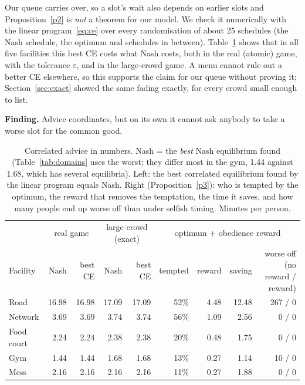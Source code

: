 \documentclass{article}
\newcommand{\finding}[1]{\par\smallskip\noindent\colorbox{cCE!7}{\parbox{\dimexpr\linewidth-2\fboxsep}{\small\textbf{Finding.} #1}}\par\smallskip}
\begin{document}
\smallskip
Our queue carries over, so a slot's wait also depends on earlier slots and Proposition~\ref{p2} is \emph{not} a
theorem for our model. We check it numerically with the linear program~\eqref{eq:ce} over every randomisation of about
25 schedules (the Nash schedule, the optimum and schedules in between). Table~\ref{tab:ce} shows that in all five
facilities this best CE costs what Nash costs, both in the real (atomic) game, with the tolerance $\varepsilon$, and in
the large-crowd game. A menu cannot rule out a better CE elsewhere, so this supports the claim for our queue without
proving it; Section~\ref{sec:exact} showed the same fading exactly, for every crowd small enough to list.

\finding{Advice coordinates, but on its own it cannot ask anybody to take a worse slot for the common good.}

\begin{table}[t]\centering\small
\caption{Correlated advice in numbers. Nash = the \emph{best} Nash equilibrium found (Table~\ref{tab:domains} uses the
worst; they differ most in the gym, 1.44 against 1.68, which has several equilibria). Left: the best correlated
equilibrium found by the linear program equals Nash.
Right (Proposition~\ref{p3}): who is tempted by the optimum, the reward that removes the temptation, the time it saves,
and how many people end up worse off than under selfish timing. Minutes per person.}\label{tab:ce}
\begin{tabular}{@{}l|rr|rr|rrrr@{}}\toprule
 & \multicolumn{2}{c|}{real game} & \multicolumn{2}{c|}{large crowd (exact)} & \multicolumn{4}{c}{optimum + obedience reward}\\
Facility & Nash & best CE & Nash & best CE & tempted & reward & saving & worse off (no reward / reward)\\\midrule
Road & 16.98 & 16.98 & 17.09 & 17.09 & 52\% & 4.48 & 12.48 & 267 / 0\\
Network & 3.69 & 3.69 & 3.74 & 3.74 & 56\% & 1.09 & 2.56 & 0 / 0\\
Food court & 2.24 & 2.24 & 2.38 & 2.38 & 20\% & 0.48 & 1.75 & 0 / 0\\
Gym & 1.44 & 1.44 & 1.68 & 1.68 & 13\% & 0.27 & 1.14 & 10 / 0\\
Mess & 2.16 & 2.16 & 2.16 & 2.16 & 11\% & 0.27 & 1.88 & 0 / 0\\\bottomrule
\end{tabular}
\end{table}
\end{document}
